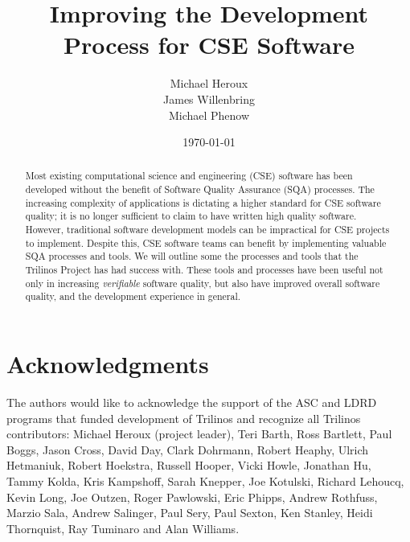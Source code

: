 \documentclass[12pt,relax]{article}
\title{Improving the Development Process for CSE Software}
\author{
Michael Heroux\\
James Willenbring\\
Michael Phenow\\
}
\date{\today} %
\begin{document}
\maketitle


\begin{abstract}

Most existing computational science and engineering (CSE) software has been 
developed without the benefit of Software Quality Assurance (SQA) processes.
The increasing complexity of applications is dictating a higher standard for 
CSE software quality; it is no longer sufficient to claim to have 
written high quality software.  However, traditional
software development models can be impractical for CSE projects to implement.
Despite this, CSE software teams can benefit by implementing
valuable SQA processes and tools.  We will outline some the
processes and tools that the Trilinos Project has had success with.  These 
tools and processes have been useful not only in increasing 
\textit{verifiable} software quality, but also have improved 
overall software quality, and the development experience in 
general.

\end{abstract}

\clearpage


\section*{Acknowledgments}

The authors would like to acknowledge the support of the ASC and LDRD programs 
that funded development of Trilinos and recognize all Trilinos contributors:
Michael Heroux (project leader), Teri Barth, Ross Bartlett, Paul Boggs, Jason
Cross, David Day, Clark Dohrmann, Robert Heaphy, Ulrich Hetmaniuk, Robert
Hoekstra, Russell Hooper, Vicki Howle, Jonathan Hu, Tammy Kolda, Kris
Kampshoff, Sarah Knepper, Joe Kotulski, Richard Lehoucq, Kevin Long, Joe
Outzen, Roger Pawlowski, Eric Phipps, Andrew Rothfuss, Marzio Sala, Andrew
Salinger, Paul Sery, Paul Sexton, Ken Stanley, Heidi Thornquist, Ray Tuminaro
and Alan Williams.

\clearpage
\tableofcontents

\clearpage
\end{document}
